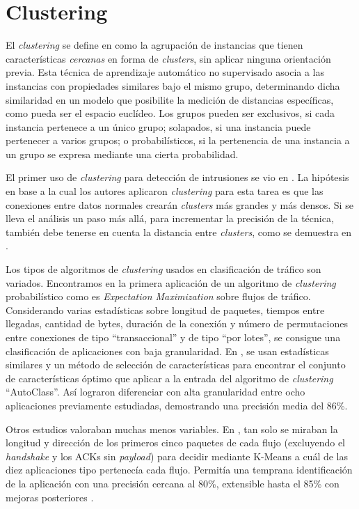 \section{Clustering}\label{clustering}

El \emph{clustering} se define en \cite{NA08} como la agrupación de instancias que tienen características \emph{cercanas} en forma de \emph{clusters}, sin aplicar ninguna orientación previa.
Esta técnica de aprendizaje automático no supervisado asocia a las instancias con propiedades similares bajo el mismo grupo,
determinando dicha similaridad en un modelo que posibilite la medición de distancias específicas, como pueda ser el espacio euclídeo.
Los grupos pueden ser exclusivos, si cada instancia pertenece a un único grupo;
solapados, si una instancia puede pertenecer a varios grupos;
o probabilísticos, si la pertenencia de una instancia a un grupo se expresa mediante una cierta probabilidad.

El primer uso de \emph{clustering} para detección de intrusiones se vio en \cite{Portnoy_2000}.
La hipótesis en base a la cual los autores aplicaron \emph{clustering} para esta tarea es que las conexiones entre datos normales crearán \emph{clusters} más grandes y más densos.
Si se lleva el análisis un paso más allá, para incrementar la precisión de la técnica, también debe tenerse en cuenta la distancia entre \emph{clusters}, como se demuestra en \cite{JSW+06}.

Los tipos de algoritmos de \emph{clustering} usados en clasificación de tráfico son variados.
Encontramos en \cite{MHL+04} la primera aplicación de un algoritmo de \emph{clustering} probabilístico como es \emph{Expectation Maximization} sobre flujos de tráfico.
Considerando varias estadísticas sobre longitud de paquetes, tiempos entre llegadas, cantidad de bytes, duración de la conexión y
número de permutaciones entre conexiones de tipo ``transaccional'' y de tipo ``por lotes'', se consigue una clasificación de aplicaciones con baja granularidad.
En \cite{ZNA05}, se usan estadísticas similares y un método de selección de características para encontrar el conjunto de características óptimo
que aplicar a la entrada del algoritmo de \emph{clustering} ``AutoClass''.
Así lograron diferenciar con alta granularidad entre ocho aplicaciones previamente estudiadas, demostrando una precisión media del 86\%.

Otros estudios valoraban muchas menos variables.
En \cite{BTA+06}, tan solo se miraban la longitud y dirección de los primeros cinco paquetes de cada flujo (excluyendo el \emph{handshake} y los ACKs sin \emph{payload})
para decidir mediante K-Means a cuál de las diez aplicaciones tipo pertenecía cada flujo.
Permitía una temprana identificación de la aplicación con una precisión cercana al 80\%, extensible hasta el 85\% con mejoras posteriores \cite{BTS06} \cite{BT07}.

